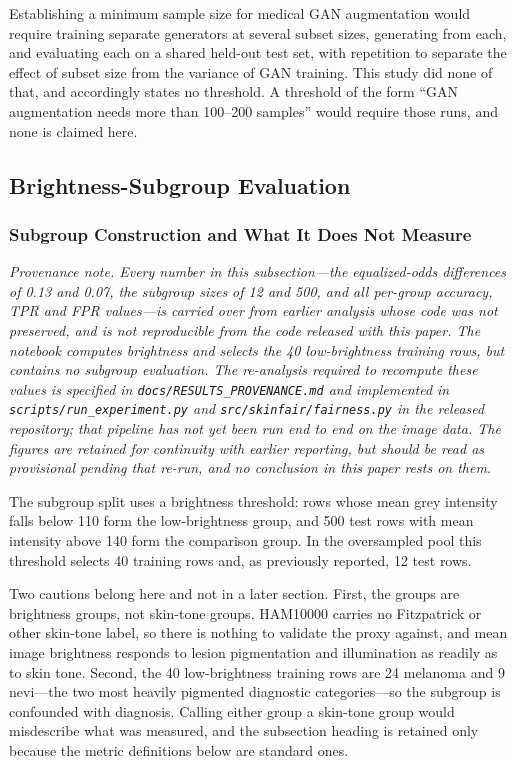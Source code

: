 \documentclass[ai,article,submit,pdftex,moreauthors]{Definitions/mdpi}
\begin{document}
Establishing a minimum sample size for medical GAN augmentation would require training separate generators at several subset sizes, generating from each, and evaluating each on a shared held-out test set, with repetition to separate the effect of subset size from the variance of GAN training. This study did none of that, and accordingly states no threshold. A threshold of the form ``GAN augmentation needs more than 100--200 samples'' would require those runs, and none is claimed here.

\subsection{Brightness-Subgroup Evaluation}

\subsubsection{Subgroup Construction and What It Does Not Measure}

\textit{Provenance note. Every number in this subsection---the equalized-odds differences of 0.13 and 0.07, the subgroup sizes of 12 and 500, and all per-group accuracy, TPR and FPR values---is carried over from earlier analysis whose code was not preserved, and is \textnormal{not} reproducible from the code released with this paper. The notebook computes brightness and selects the 40 low-brightness training rows, but contains no subgroup evaluation. The re-analysis required to recompute these values is specified in \texttt{docs/RESULTS\_PROVENANCE.md} and implemented in \texttt{scripts/run\_experiment.py} and \texttt{src/skinfair/fairness.py} in the released repository; that pipeline has not yet been run end to end on the image data. The figures are retained for continuity with earlier reporting, but should be read as provisional pending that re-run, and no conclusion in this paper rests on them.}

The subgroup split uses a brightness threshold: rows whose mean grey intensity falls below 110 form the low-brightness group, and 500 test rows with mean intensity above 140 form the comparison group. In the oversampled pool this threshold selects 40 training rows and, as previously reported, 12 test rows.

Two cautions belong here and not in a later section. First, the groups are brightness groups, not skin-tone groups. HAM10000 carries no Fitzpatrick or other skin-tone label, so there is nothing to validate the proxy against, and mean image brightness responds to lesion pigmentation and illumination as readily as to skin tone. Second, the 40 low-brightness training rows are 24 melanoma and 9 nevi---the two most heavily pigmented diagnostic categories---so the subgroup is confounded with diagnosis. Calling either group a skin-tone group would misdescribe what was measured, and the subsection heading is retained only because the metric definitions below are standard ones.
\end{document}
